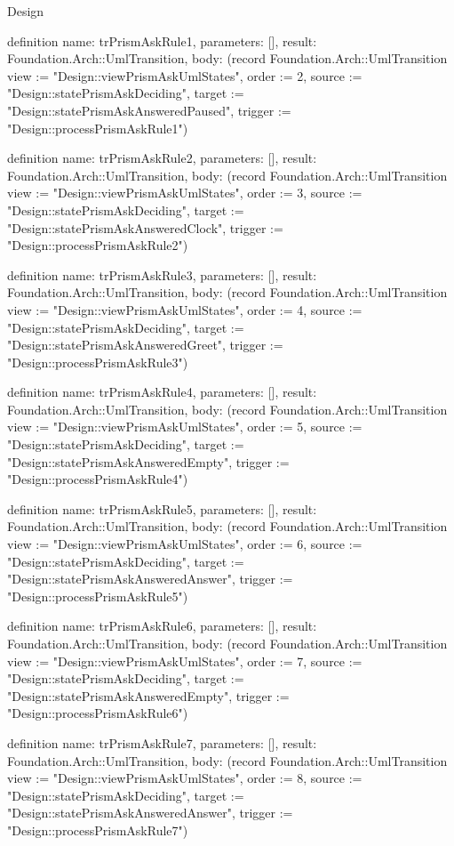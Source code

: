 \begin{lexlean}{Design}
\begin{semanticmodule}
definition{
  name: trPrismAskRule1,
  parameters: [],
  result: Foundation.Arch::UmlTransition,
  body: (record Foundation.Arch::UmlTransition {view := "Design::viewPrismAskUmlStates", order := 2, source := "Design::statePrismAskDeciding", target := "Design::statePrismAskAnsweredPaused", trigger := "Design::processPrismAskRule1"})
}

definition{
  name: trPrismAskRule2,
  parameters: [],
  result: Foundation.Arch::UmlTransition,
  body: (record Foundation.Arch::UmlTransition {view := "Design::viewPrismAskUmlStates", order := 3, source := "Design::statePrismAskDeciding", target := "Design::statePrismAskAnsweredClock", trigger := "Design::processPrismAskRule2"})
}

definition{
  name: trPrismAskRule3,
  parameters: [],
  result: Foundation.Arch::UmlTransition,
  body: (record Foundation.Arch::UmlTransition {view := "Design::viewPrismAskUmlStates", order := 4, source := "Design::statePrismAskDeciding", target := "Design::statePrismAskAnsweredGreet", trigger := "Design::processPrismAskRule3"})
}

definition{
  name: trPrismAskRule4,
  parameters: [],
  result: Foundation.Arch::UmlTransition,
  body: (record Foundation.Arch::UmlTransition {view := "Design::viewPrismAskUmlStates", order := 5, source := "Design::statePrismAskDeciding", target := "Design::statePrismAskAnsweredEmpty", trigger := "Design::processPrismAskRule4"})
}

definition{
  name: trPrismAskRule5,
  parameters: [],
  result: Foundation.Arch::UmlTransition,
  body: (record Foundation.Arch::UmlTransition {view := "Design::viewPrismAskUmlStates", order := 6, source := "Design::statePrismAskDeciding", target := "Design::statePrismAskAnsweredAnswer", trigger := "Design::processPrismAskRule5"})
}

definition{
  name: trPrismAskRule6,
  parameters: [],
  result: Foundation.Arch::UmlTransition,
  body: (record Foundation.Arch::UmlTransition {view := "Design::viewPrismAskUmlStates", order := 7, source := "Design::statePrismAskDeciding", target := "Design::statePrismAskAnsweredEmpty", trigger := "Design::processPrismAskRule6"})
}

definition{
  name: trPrismAskRule7,
  parameters: [],
  result: Foundation.Arch::UmlTransition,
  body: (record Foundation.Arch::UmlTransition {view := "Design::viewPrismAskUmlStates", order := 8, source := "Design::statePrismAskDeciding", target := "Design::statePrismAskAnsweredAnswer", trigger := "Design::processPrismAskRule7"})
}


\end{semanticmodule}
\end{lexlean}
